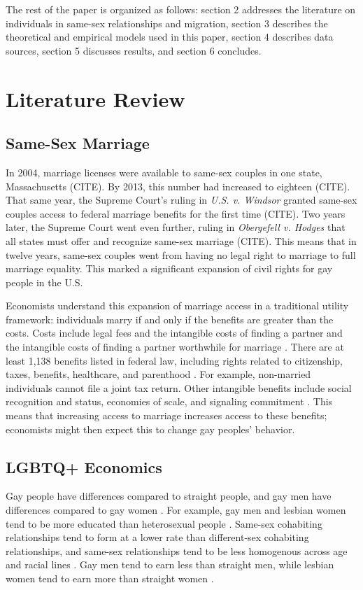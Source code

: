 \documentclass[12pt,letterpaper]{article}
\begin{document}
The rest of the paper is organized as follows: section 2 addresses the literature on individuals in same-sex relationships and migration, section 3 describes the theoretical and empirical models used in this paper, section 4 describes data sources, section 5 discusses results, and section 6 concludes.

\section{Literature Review}
\subsection{Same-Sex Marriage}
In 2004, marriage licenses were available to same-sex couples in one state, Massachusetts (CITE). By 2013, this number had increased to eighteen (CITE). That same year, the Supreme Court's ruling in \textit{U.S. v. Windsor} granted same-sex couples access to federal marriage benefits for the first time (CITE). Two years later, the Supreme Court went even further, ruling in \textit{Obergefell v. Hodges} that all states must offer and recognize same-sex marriage (CITE). This means that in twelve years, same-sex couples went from having no legal right to marriage to full marriage equality. This marked a significant expansion of civil rights for gay people in the U.S.

Economists understand this expansion of marriage access in a traditional utility framework: individuals marry if and only if the benefits are greater than the costs. Costs include legal fees and the intangible costs of finding a partner and the intangible costs of finding a partner worthwhile for marriage \citep{9}. There are at least 1,138 benefits listed in federal law, including rights related to citizenship, taxes, benefits, healthcare, and parenthood \citep{1, 8}. For example, non-married individuals cannot file a joint tax return. Other intangible benefits include social recognition and status, economies of scale, and signaling commitment \citep{8}. This means that increasing access to marriage increases access to these benefits; economists might then expect this to change gay peoples’ behavior. 

\subsection{LGBTQ+ Economics}

Gay people have differences compared to straight people, and gay men have differences compared to gay women \citep{2, 15}. For example, gay men and lesbian women tend to be more educated than heterosexual people \citep{2, 7, 11}. Same-sex cohabiting relationships tend to form at a lower rate than different-sex cohabiting relationships, and same-sex relationships tend to be less homogenous across age and racial lines \citep{2, 7}. Gay men tend to earn less than straight men, while lesbian women tend to earn more than straight women \citep{6}.
\end{document}
